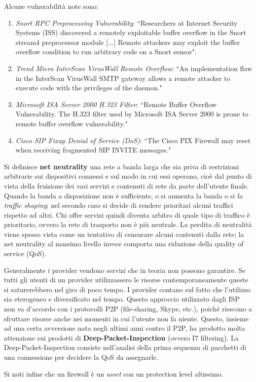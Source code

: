 Alcune vulnerabilità note sono:
\begin{enumerate}
	\item \textit{Snort RPC Preprocessing Vulnerability}: \textquotedblleft Researchers at Internet Security Systems (ISS) discovered a remotely exploitable buffer overflow in the Snort stream4 preprocessor module [...] Remote attackers may exploit the buffer overflow condition to run arbitrary code on a Snort sensor".
	\item \textit{Trend Micro InterScan VirusWall Remote Overflow}: \textquotedblleft An implementation flaw in the InterScan VirusWall SMTP gateway allows a remote attacker to execute code with the privileges of the daemon."
	\item \textit{Microsoft ISA Server 2000 H.323 Filter}: \textquotedblleft Remote Buffer Overflow Vulnerability. The H.323 filter used by Microsoft ISA Server 2000 is prone to remote buffer overflow vulnerability."
	\item \textit{Cisco SIP Fixup Denial of Service (DoS)}: \textquotedblleft The Cisco PIX Firewall may reset when receiving fragmented SIP INVITE messages."
\end{enumerate}

Si definisce \textbf{net neutrality} una rete a banda larga che sia priva di restrizioni arbitrarie sui dispositivi connessi e sul modo in cui essi operano, cioè dal punto di vista della fruizione dei vari servizi e contenuti di rete da parte dell'utente finale. Quando la banda a disposizione non è sufficiente, o si aumenta la banda o si fa \textit{traffic shaping}; nel secondo caso si decide di rendere prioritari alcuni traffici rispetto ad altri. Chi offre servizi quindi diventa arbitro di quale tipo di traffico è prioritario, ovvero la rete di trasporto non è più neutrale. La perdita di neutralità viene spesso vista come un tentativo di censurare alcuni contenuti dalla rete; la net neutrality al massimo livello invece comporta una riduzione della quality of service (QoS).

Generalmente i provider vendono servizi che in teoria non possono garantire. Se tutti gli utenti di un provider utilizzassero le risorse contemporaneamente queste si saturerebbero nel giro di poco tempo. I provider contano sul fatto che l'utilizzo sia eterogeneo e diversificato nel tempo. Questo approccio utilizzato dagli ISP non va d'accordo con i protocolli P2P (file-sharing, Skype, etc.), poiché riescono a sfruttare risorse anche nei momenti in cui l'utente non fa niente. Questo, insieme ad una certa avversione nata negli ultimi anni contro il P2P, ha prodotto molta attenzione sui prodotti di \textbf{Deep-Packet-Inspection} (ovvero I7 filtering). La Deep-Packet-Inspection consiste nell'analisi della prima sequenza di pacchetti di una connessione per decidere la QoS da assegnarle.

Si noti infine che un firewall è un \textit{asset} con un protection level altissimo.